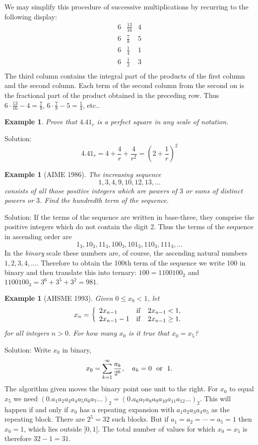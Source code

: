 \documentclass[11pt, openany]{book}
\theoremstyle{change} \theoremheaderfont{\blue\sffamily\bfseries}
\newtheorem{exa}[thm]{Example}
\theoremstyle{nonumberplain} \theoremheaderfont{\sffamily\bfseries}
\newcommand{\í}{\'{\i}}
\begin{document}
We may simplify this procedure of successive multiplications by
recurring to the following display:
\renewcommand{\arraystretch}{2}
$$
\begin{array}{l|l|l}
6 & \frac{13}{16} & 4 \\ \hline
6 & \frac{7}{8} & 5 \\
\hline
6 & \frac{1}{4} & 1 \\
\hline
6 & \frac{1}{2} & 3 \\
\end{array}
$$
The third column contains the integral part of the products of the
first column and the second column. Each term of the second column
from the second on is the fractional part of the product obtained
in the preceding row. Thus $6\cdot\frac{13}{16} - 4 =
\frac{7}{8}$, $6\cdot\frac{7}{8} - 5 = \frac{1}{4}$, etc..
\begin{exa}
Prove that $4.41_r$ is a perfect square in any scale of notation.
\end{exa}
Solution:
$$4.41_r = 4 + \frac{4}{r} + \frac{4}{r^2} = \left(2 + \frac{1}{r}\right)^2$$
\begin{exa}[AIME 1986] The increasing sequence
$$1, 3, 4, 9, 10, 12, 13, \ldots$$consists of all those positive integers which are powers of $3$ or
sums of distinct powers or $3$. Find the hundredth term of the
sequence.
\end{exa}
Solution: If the terms of the sequence are written in base-three,
they comprise the positive integers which do not contain the digit
2. Thus the terms of the sequence in ascending order are
$$1_3, 10_3, 11_3, 100_3, 101_3, 110_3, 111_3, \ldots$$In the {\em binary} scale these numbers are, of course,
the ascending natural numbers $1, 2, 3, 4, \ldots$. Therefore to
obtain the 100th term of the sequence we write 100 in binary and
then translate this into ternary: $100 = 1100100_2$ and $1100100_3
= 3^6 + 3^5 + 3^2 = 981.$
\begin{exa}[AHSME 1993] Given $0 \leq x_0 < 1$, let
$$x_n = \left\{ \begin{array}{lll}
2x_{n - 1} & {\rm if} & 2x_{n - 1} < 1, \\
2x_{n - 1} - 1 & {\rm if} & 2x_{n - 1} \geq 1.\\
\end{array}
\right.$$for all integers $n > 0$. For how many $x_0$ is it true
that $x_0 = x_5$?
\end{exa}
Solution: Write $x_0$ in binary,
$$x_0 = \sum _{k = 1} ^\infty \frac{a_k}{2^k}, \ \ \ a_k = 0 \ \ {\rm or} \ \ 1.$$
The algorithm given moves the binary point one unit to the right.
For $x_0$ to equal $x_5$ we need $(0.a_1a_2a_3a_4a_5a_6a_7\ldots
)_2 = (0.a_6a_7a_8a_9a_{10}a_{11}a_{12}\ldots )_2.$ This will
happen if and only if $x_0$ has a repeating expansion with
$a_1a_2a_3a_4a_5$ as the repeating block. There are $2^5 = 32$
such blocks. But if $a_1 = a_2 = \cdots = a_5 = 1$ then $x_0 = 1$,
which lies outside $]0, 1[$. The total number of values for which
$x_0 = x_5$ is therefore $32 - 1 = 31.$
\end{document}
